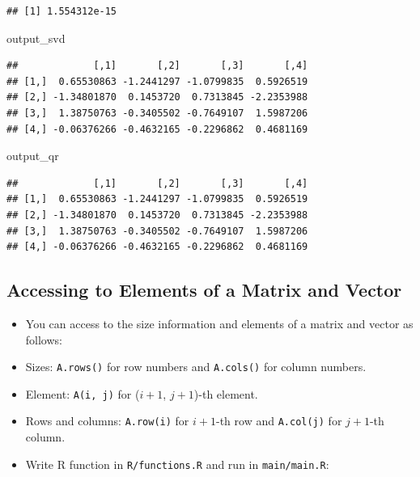 \documentclass[]{book}
\newenvironment{Shaded}{\begin{snugshade}}{\end{snugshade}}
\newcommand{\NormalTok}[1]{#1}
\begin{document}
\begin{verbatim}
## [1] 1.554312e-15
\end{verbatim}

\begin{Shaded}
\begin{Highlighting}[]
\NormalTok{output_svd}
\end{Highlighting}
\end{Shaded}

\begin{verbatim}
##             [,1]       [,2]       [,3]       [,4]
## [1,]  0.65530863 -1.2441297 -1.0799835  0.5926519
## [2,] -1.34801870  0.1453720  0.7313845 -2.2353988
## [3,]  1.38750763 -0.3405502 -0.7649107  1.5987206
## [4,] -0.06376266 -0.4632165 -0.2296862  0.4681169
\end{verbatim}

\begin{Shaded}
\begin{Highlighting}[]
\NormalTok{output_qr}
\end{Highlighting}
\end{Shaded}

\begin{verbatim}
##             [,1]       [,2]       [,3]       [,4]
## [1,]  0.65530863 -1.2441297 -1.0799835  0.5926519
## [2,] -1.34801870  0.1453720  0.7313845 -2.2353988
## [3,]  1.38750763 -0.3405502 -0.7649107  1.5987206
## [4,] -0.06376266 -0.4632165 -0.2296862  0.4681169
\end{verbatim}

\subsection{Accessing to Elements of a Matrix and
Vector}\label{accessing-to-elements-of-a-matrix-and-vector}

\begin{itemize}
\item
  You can access to the size information and elements of a matrix and
  vector as follows:
\item
  Sizes: \texttt{A.rows()} for row numbers and \texttt{A.cols()} for
  column numbers.
\item
  Element: \texttt{A(i,\ j)} for (\(i + 1\), \(j + 1\))-th element.
\item
  Rows and columns: \texttt{A.row(i)} for \(i + 1\)-th row and
  \texttt{A.col(j)} for \(j + 1\)-th column.
\item
  Write R function in \texttt{R/functions.R} and run in
  \texttt{main/main.R}:
\end{itemize}
\end{document}
